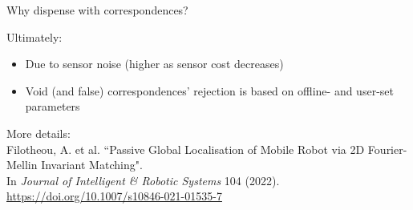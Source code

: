 \begin{frame}[noframenumbering]{Why dispense with correspondences?}

  Ultimately:
  \begin{itemize}
    \item Due to sensor noise (higher as sensor cost decreases)
    \item Void (and false) correspondences' rejection is based on offline- and user-set parameters
  \end{itemize}

  \vfill
  {\tiny
  More details: \\
  Filotheou, A. et al. ``Passive Global Localisation of Mobile Robot via 2D
  Fourier-Mellin Invariant Matching". \\ \vspace{-0.25cm}
  In \textit{Journal of Intelligent \& Robotic Systems} 104 (2022). \url{https://doi.org/10.1007/s10846-021-01535-7}}

\end{frame}
